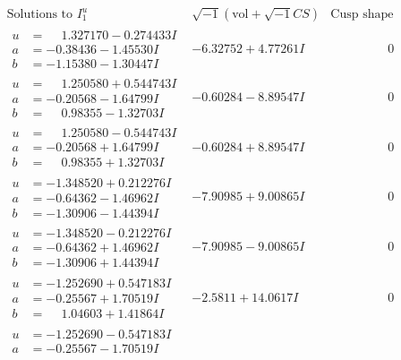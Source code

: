 \documentclass[1p]{elsarticle_modified}
\theoremstyle{definition}
\newcommand{\I}{\sqrt{-1}}
\begin{document}
$$\begin{array}{c|c|c}
\text{Solutions to }I^u_{1}& \I (\text{vol} + \sqrt{-1}CS) & \text{Cusp shape}\\
 \hline 
\begin{aligned}
u &= \phantom{-}1.327170 - 0.274433 I \\
a &= -0.38436 - 1.45530 I \\
b &= -1.15380 - 1.30447 I\end{aligned}
 & -6.32752 + 4.77261 I & \phantom{-0.000000 } 0 \\ \hline\begin{aligned}
u &= \phantom{-}1.250580 + 0.544743 I \\
a &= -0.20568 - 1.64799 I \\
b &= \phantom{-}0.98355 - 1.32703 I\end{aligned}
 & -0.60284 - 8.89547 I & \phantom{-0.000000 } 0 \\ \hline\begin{aligned}
u &= \phantom{-}1.250580 - 0.544743 I \\
a &= -0.20568 + 1.64799 I \\
b &= \phantom{-}0.98355 + 1.32703 I\end{aligned}
 & -0.60284 + 8.89547 I & \phantom{-0.000000 } 0 \\ \hline\begin{aligned}
u &= -1.348520 + 0.212276 I \\
a &= -0.64362 - 1.46962 I \\
b &= -1.30906 - 1.44394 I\end{aligned}
 & -7.90985 + 9.00865 I & \phantom{-0.000000 } 0 \\ \hline\begin{aligned}
u &= -1.348520 - 0.212276 I \\
a &= -0.64362 + 1.46962 I \\
b &= -1.30906 + 1.44394 I\end{aligned}
 & -7.90985 - 9.00865 I & \phantom{-0.000000 } 0 \\ \hline\begin{aligned}
u &= -1.252690 + 0.547183 I \\
a &= -0.25567 + 1.70519 I \\
b &= \phantom{-}1.04603 + 1.41864 I\end{aligned}
 & -2.5811 + 14.0617 I & \phantom{-0.000000 } 0 \\ \hline\begin{aligned}
u &= -1.252690 - 0.547183 I \\
a &= -0.25567 - 1.70519 I \\

\end{aligned}
\end{array}$$
\end{document}
